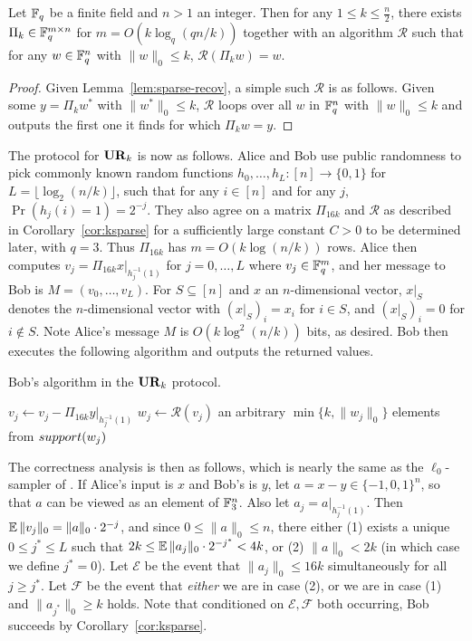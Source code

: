 \begin{corollary}\label{cor:ksparse}
Let $\mathbb{F}_q$ be a finite field and $n>1$ an integer. Then for any $1\le k\le \frac n2$, there exists $\Pi_k\in \mathbb{F}_q^{m\times n}$ for $m = O(k\log_q(qn/k))$ together with an algorithm $\mathcal{R}$ such that for any $w\in\mathbb{F}_q^n$ with $\|w\|_0 \le k$, $\mathcal{R}(\Pi_k w) = w$.
\end{corollary}
\begin{proof}
Given Lemma~\ref{lem:sparse-recov}, a simple such $\mathcal{R}$ is as follows. Given some $y = \Pi_k w^*$ with $\|w^*\|_0 \le k$, $\mathcal{R}$ loops over all $w$ in $\mathbb{F}_q^n$ with $\|w\|_0 \le k$ and outputs the first one it finds for which $\Pi_k w = y$.
\end{proof}

The protocol for $\mathbf{UR}_k$ is now as follows. Alice and Bob use public randomness to pick commonly known random functions $h_0,\ldots,h_L:[n]\rightarrow\{0,1\}$ for $L = \lfloor\log_2(n/k)\rfloor$, such that for any $i\in[n]$ and for any $j$, $\Pr(h_j(i) = 1) = 2^{-j}$. They also agree on a matrix $\Pi_{16k}$ and $\mathcal{R}$ as described in Corollary~\ref{cor:ksparse} for a sufficiently large constant $C>0$ to be determined later, with $q = 3$. Thus $\Pi_{16k}$ has $m = O(k\log(n/k))$ rows. Alice then computes $v_j = \Pi_{16k} x|_{h_j^{-1}(1)}$ for $j=0,\ldots,L$ where $v_j\in\mathbb{F}_q^m$, and her message to Bob is $M = (v_0,\ldots,v_L)$. For $S\subseteq [n]$ and $x$ an $n$-dimensional vector, $x|_S$ denotes the $n$-dimensional vector with $(x|_S)_i = x_i$ for $i\in S$, and $(x|_S)_i = 0$ for $i\notin S$. Note Alice's message $M$ is $O(k\log^2(n/k))$ bits, as desired. Bob then executes the following algorithm and outputs the returned values.

\begin{algorithm}[H] 
  \caption{Bob's algorithm in the $\mathbf{UR}_k$ protocol.} \label{algo:bob-protocol}
  \begin{algorithmic}[1]
      \State $v_j \leftarrow v_j - \Pi_{16k} y|_{h_j^{-1}(1)}$
      \State $w_j\leftarrow \mathcal{R}(v_j)$
      \State \Return an arbitrary $\min\{k, \|w_j\|_0\}$ elements from $\mathop{support}(w_j)$
      \EndIf
    \EndFor
    \EndProcedure
  \end{algorithmic}
\end{algorithm}

The correctness analysis is then as follows, which is nearly the same as the $\ell_0$-sampler of \cite{JowhariST11}. If Alice's input is $x$ and Bob's is $y$, let $a = x-y \in \{-1,0,1\}^n$, so that $a$ can be viewed as an element of $\mathbb{F}_3^n$. Also let $a_j = a|_{h_j^{-1}(1)}$. Then $\operatorname*{\mathbb{E}} \|v_j\|_0 = \|a\|_0\cdot 2^{-j}$, and since $0\le \|a\|_0 \le n$, there either (1) exists a unique $0\le j^*\le L$ such that $2k\le \operatorname*{\mathbb{E}}\|a_j\|_0\cdot 2^{-j^*}< 4k$, or (2) $\|a\|_0 < 2k$ (in which case we define $j^* = 0$). Let $\mathcal{E}$ be the event that $\|a_j\|_0 \le 16k$ simultaneously for all $j\ge j^*$. Let $\mathcal{F}$ be the event that {\it either} we are in case (2), or we are in case (1) and $\|a_{j^*}\|_0 \ge k$ holds. Note that conditioned on $\mathcal{E}, \mathcal{F}$ both occurring, Bob succeeds by Corollary~\ref{cor:ksparse}.

